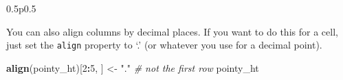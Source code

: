 \documentclass[]{article}
\newenvironment{Shaded}{\begin{snugshade}}{\end{snugshade}}
\newcommand{\KeywordTok}[1]{\textcolor[rgb]{0.13,0.29,0.53}{\textbf{#1}}}
\newcommand{\DecValTok}[1]{\textcolor[rgb]{0.00,0.00,0.81}{#1}}
\newcommand{\StringTok}[1]{\textcolor[rgb]{0.31,0.60,0.02}{#1}}
\newcommand{\CommentTok}[1]{\textcolor[rgb]{0.56,0.35,0.01}{\textit{#1}}}
\newcommand{\OperatorTok}[1]{\textcolor[rgb]{0.81,0.36,0.00}{\textbf{#1}}}
\newcommand{\NormalTok}[1]{#1}
\begin{document}
\begin{table}[h]
\begin{tabularx}{0.5\textwidth}{p{}}
 \tabularnewline[-0.5pt]


\end{tabularx}
\end{table}

\FloatBarrier

You can also align columns by decimal places. If you want to do this for
a cell, just set the \texttt{align} property to `.' (or whatever you use
for a decimal point).

\begin{Shaded}
\begin{Highlighting}[]
\KeywordTok{align}\NormalTok{(pointy_ht)[}\DecValTok{2}\OperatorTok{:}\DecValTok{5}\NormalTok{, ] <-}\StringTok{ "."} \CommentTok{# not the first row}
\NormalTok{pointy_ht}
\end{Highlighting}
\end{Shaded}
\end{document}
